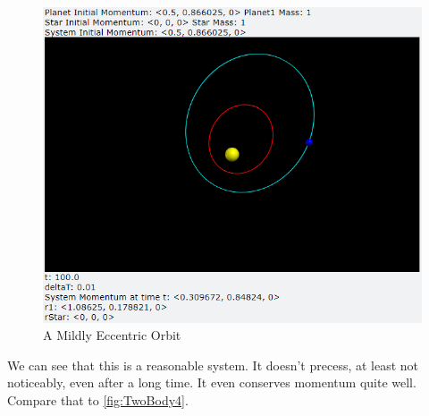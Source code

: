 \documentclass[12pt]{article}
\begin{document}
\begin{enumerate}
        \begin{figure}[H]
            \begin{center}
               \includegraphics[scale=.5]{TwoBody3.png}
               \caption{A Mildly Eccentric Orbit}
               \label{fig:TwoBody3}
            \end{center}
        \end{figure}
        \noindent
        We can see that this is a reasonable system. It doesn't precess, at least not noticeably, even after 
        a long time. It even conserves momentum quite well. Compare that to \autoref{fig:TwoBody4}.


\end{enumerate}
\end{document}
